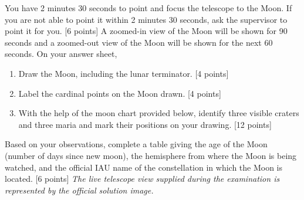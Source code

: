 You have 2 minutes 30 seconds to point and focus the telescope to the Moon. If you are not able to point it within 2 minutes 30 seconds, ask the supervisor to point it for you. \hfill[6 points]
A zoomed-in view of the Moon will be shown for 90 seconds and a zoomed-out view of the Moon will be shown for the next 60 seconds.
On your answer sheet,
\begin{enumerate}
\item Draw the Moon, including the lunar terminator. \hfill[4 points]
\item Label the cardinal points on the Moon drawn. \hfill[4 points]
\item With the help of the moon chart provided below, identify three visible craters and three maria and mark their positions on your drawing. \hfill[12 points]
\end{enumerate}
Based on your observations, complete a table giving the age of the Moon (number of days since new moon), the hemisphere from where the Moon is being watched, and the official IAU name of the constellation in which the Moon is located. \hfill[6 points]
\textit{The live telescope view supplied during the examination is represented by the official solution image.}
